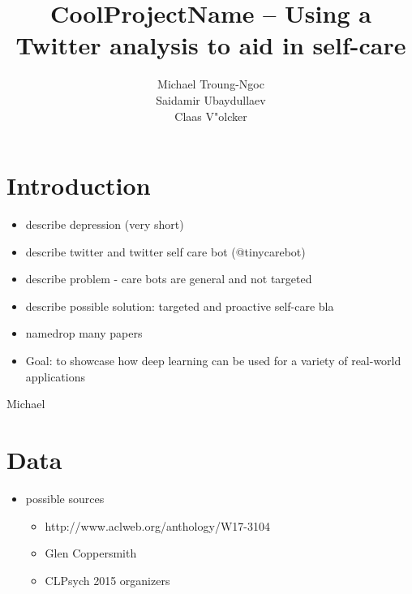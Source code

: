 \documentclass[colorback,accentcolor=tud9c]{tudreport}
\title{CoolProjectName -- Using a Twitter analysis to aid in self-care}
\subtitle{Michael Troung-Ngoc\\Saidamir Ubaydullaev\\Claas V"olcker}
\begin{document}
\maketitle


\section*{Introduction}

\begin{itemize}
    \item describe depression (very short)
    \item describe twitter and twitter self care bot (@tinycarebot)
    \item describe problem - care bots are general and not targeted
    \item describe possible solution: targeted and proactive self-care bla
    \item namedrop many papers
    \item Goal: to showcase how deep learning can be used for a variety of real-world applications
\end{itemize}

Michael


\section*{Data}
\label{data}
\begin{itemize}
    \item possible sources
    \begin{itemize}
        \item http://www.aclweb.org/anthology/W17-3104
    \item Glen Coppersmith
    \item CLPsych 2015 organizers
    \end{itemize}
\end{itemize}
\end{document}

